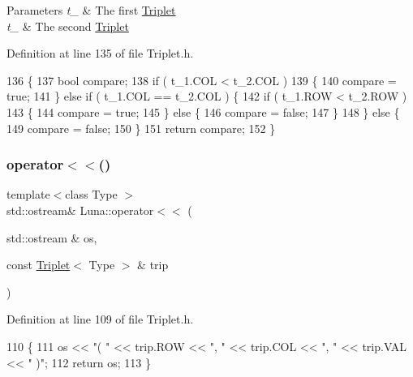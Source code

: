 \begin{DoxyParams}{Parameters}
{\em t\+\_} & The first \hyperlink{classLuna_1_1Triplet}{Triplet} \\
\hline
{\em t\+\_} & The second \hyperlink{classLuna_1_1Triplet}{Triplet} \\
\hline
\end{DoxyParams}


Definition at line 135 of file Triplet.\+h.


\begin{DoxyCode}
136     \{
137         \textcolor{keywordtype}{bool} compare;
138         \textcolor{keywordflow}{if} ( t\_1.COL < t\_2.COL )
139         \{
140             compare = \textcolor{keyword}{true};
141         \} \textcolor{keywordflow}{else} \textcolor{keywordflow}{if} ( t\_1.COL == t\_2.COL ) \{
142             \textcolor{keywordflow}{if} ( t\_1.ROW < t\_2.ROW )
143             \{
144                 compare = \textcolor{keyword}{true};
145             \} \textcolor{keywordflow}{else} \{
146                 compare = \textcolor{keyword}{false};
147             \}
148         \} \textcolor{keywordflow}{else} \{
149             compare = \textcolor{keyword}{false};
150         \}
151         \textcolor{keywordflow}{return} compare;
152     \}
\end{DoxyCode}
\mbox{\label{namespaceLuna_ae16088bac866c2bd6332b598aa0766cb}} 
\subsubsection{\texorpdfstring{operator$<$$<$()}{operator<<()}\hspace{0.1cm}{\footnotesize\ttfamily [1/5]}}
{\footnotesize\ttfamily template$<$class Type $>$ \\
std\+::ostream\& Luna\+::operator$<$$<$ (\begin{DoxyParamCaption}\item[{std\+::ostream \&}]{os,  }\item[{const \hyperlink{classLuna_1_1Triplet}{Triplet}$<$ Type $>$ \&}]{trip }\end{DoxyParamCaption})\hspace{0.3cm}{\ttfamily [inline]}}



Definition at line 109 of file Triplet.\+h.


\begin{DoxyCode}
110   \{
111         os << \textcolor{stringliteral}{"( "} << trip.ROW << \textcolor{stringliteral}{", "} << trip.COL << \textcolor{stringliteral}{", "} << trip.VAL << \textcolor{stringliteral}{" )"};
112     \textcolor{keywordflow}{return} os;
113   \}
\end{DoxyCode}
\mbox{\label{namespaceLuna_ac5771a779e9fac8d1f586a9046f82761}} 
